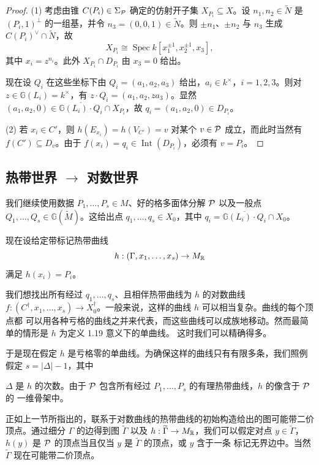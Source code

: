 \begin{proof}
(1) 考虑由锥 $C(P_i)\in\Sigma_{\mathcal{P}}$ 确定的仿射开子集 $X_{P_i}\subseteq X$。设
$n_1,n_2\in\widetilde{N}$ 是 $(P_i,1)^{\perp}$ 的一组基，并令 $n_3 = (0,0,1)\in\widetilde{N}$。则
$\pm n_1$、$\pm n_2$ 与 $n_3$ 生成 $C(P_i)^\vee\cap\widetilde{N}$，故
\[
X_{P_i} \cong \operatorname{Spec}k[x_1^{\pm1},x_2^{\pm1},x_3],
\]
其中 $x_i = z^{n_i}$。此外 $X_{P_i}\cap D_{P_i}$ 由 $x_3 = 0$ 给出。

现在设 $Q_i$ 在这些坐标下由 $Q_i = (a_1,a_2,a_3)$ 给出，$a_i\in k^{\times}$，$i=1,2,3$。则对
$z\in\mathbb{G}(L_i) = k^{\times}$，有 $z\cdot Q_i = (a_1,a_2,za_3)$。显然
$(a_1,a_2,0)\in\overline{\mathbb{G}(L_i)\cdot Q_i}\cap X_{P_i}$，故
$q_i = (a_1,a_2,0)\in D_{P_i}$。

(2) 若 $x_i\in C'$，则 $h(E_{x_i}) = h(V_{C'}) = v$ 对某个 $v\in\mathcal{P}$ 成立，而此时当然有
$f(C')\subseteq D_v$。由于 $f(x_i) = q_i \in \operatorname{Int}(D_{P_i})$，必须有 $v = P_i$。
\end{proof}

\subsection{热带世界 $\to$ 对数世界}
我们继续使用数据 $P_1,\dots,P_s \in M$、好的格多面体分解 $\mathcal{P}$ 以及一般点
$Q_1,\dots,Q_s \in \mathbb{G}(\widetilde{M})$。这给出点 $q_1,\dots,q_s \in X_0$，其中
$q_i = \overline{\mathbb{G}(L_i)\cdot Q_i}\cap X_0$。

现在设给定带标记热带曲线
\[
h : (\Gamma,x_1,\dots,x_s) \to M_{\mathbb{R}}
\]
满足 $h(x_i) = P_i$。

我们想找出所有经过 $q_1,\dots,q_s$、且相伴热带曲线为 $h$ 的对数曲线
$f : (C^{\dagger},x_1,\dots,x_s) \to X_0^{\dagger}$。一般来说，这样的曲线 $h$ 可以相当复杂。曲线的每个顶点都
可以用各种亏格的曲线之并来代表，而这些曲线可以成族地移动。然而最简单的情形是 $h$ 为定义 1.19 意义下的单曲线。
这时我们可以精确得多。

于是现在假定 $h$ 是亏格零的单曲线。为确保这样的曲线只有有限多条，我们照例假定 $s = |\Delta|-1$，其中

$\Delta$ 是 $h$ 的次数。由于 $\mathcal{P}$ 包含所有经过 $P_1,\dots,P_s$ 的有理热带曲线，$h$ 的像含于 $\mathcal{P}$ 的
一维骨架中。

正如上一节所指出的，联系于对数曲线的热带曲线的初始构造给出的图可能带二价顶点。通过细分 $\Gamma$ 的边得到图
$\widetilde{\Gamma}$ 以及 $h : \widetilde{\Gamma} \to M_{\mathbb{R}}$，我们可以假定对点
$y\in\widetilde{\Gamma}$，$h(y)$ 是 $\mathcal{P}$ 的顶点当且仅当 $y$ 是 $\widetilde{\Gamma}$ 的顶点，或 $y$ 含于一条
标记无界边中。当然 $\widetilde{\Gamma}$ 现在可能带二价顶点。

